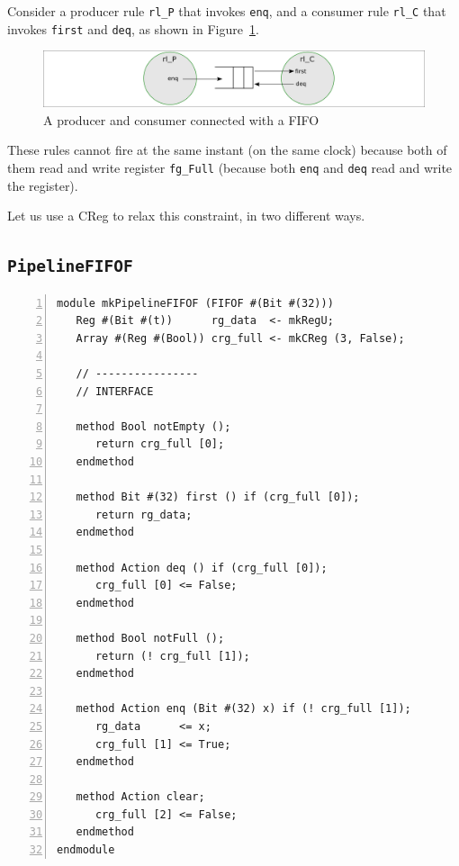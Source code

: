 Consider a producer rule \verb|rl_P| that invokes \verb|enq|, and a
consumer rule \verb|rl_C| that invokes \verb|first| and \verb|deq|,
as shown in Figure~\ref{Fig_FIFO_Producer_Consumer}.
\begin{figure}[htbp]
  \centerline{\includegraphics[width=6in,angle=0]{Figures/Fig_FIFO_Producer_Consumer}}
  \caption{\label{Fig_FIFO_Producer_Consumer}A producer and consumer connected with a FIFO}
\end{figure}

These rules cannot fire at the same instant (on the same clock)
because both of them read and write register \verb|fg_Full| (because
both \verb|enq| and \verb|deq| read and write the register).

Let us use a CReg to relax this constraint, in two different ways.


\subsection{{\tt PipelineFIFOF}}

{\footnotesize
\begin{Verbatim}[frame=single, numbers=left]
module mkPipelineFIFOF (FIFOF #(Bit #(32)))
   Reg #(Bit #(t))      rg_data  <- mkRegU;
   Array #(Reg #(Bool)) crg_full <- mkCReg (3, False);

   // ----------------
   // INTERFACE

   method Bool notEmpty ();
      return crg_full [0];
   endmethod

   method Bit #(32) first () if (crg_full [0]);
      return rg_data;
   endmethod

   method Action deq () if (crg_full [0]);
      crg_full [0] <= False;
   endmethod

   method Bool notFull ();
      return (! crg_full [1]);
   endmethod

   method Action enq (Bit #(32) x) if (! crg_full [1]);
      rg_data      <= x;
      crg_full [1] <= True;
   endmethod

   method Action clear;
      crg_full [2] <= False;
   endmethod
endmodule
\end{Verbatim}
}

